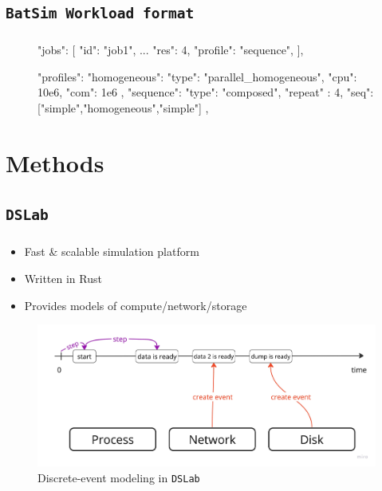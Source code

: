 \documentclass[t]{beamer}  %
\begin{document}
	\subsection{\texttt{BatSim Workload format}}
	\begin{frame}[fragile]
		\frametitle{\insertsection} 
		\framesubtitle{\insertsubsection}
		\begin{figure}
			\scriptsize
		\begin{jsoncode}
"jobs": [
  {"id": "job1",  ...  "res": 4, "profile": "sequence"},
],

"profiles": {
  "homogeneous": {
    "type": "parallel_homogeneous",
    "cpu": 10e6,
    "com": 1e6
  },
  "sequence": {
    "type": "composed",
    "repeat" : 4,
    "seq": ["simple","homogeneous","simple"]
  },
}
		\end{jsoncode}
	\end{figure}
	\end{frame}


	\section{Methods}
	\subsection{\texttt{DSLab}}


	\begin{frame}
		\frametitle{\insertsection} 
		\framesubtitle{\insertsubsection}


		\begin{multicols}{2}
			\begin{itemize}
			\item Fast \& scalable simulation platform  
			\item Written in Rust 
			\item Provides models of compute/network/storage  
			\end{itemize}
		\end{multicols}
		
		\begin{figure}[H]
			\centering
			\includegraphics[width=\linewidth]{images/event_pipeline_6}
			\caption*{Discrete-event modeling in \texttt{DSLab}}
		\end{figure}
		
	\end{frame}
\end{document}
